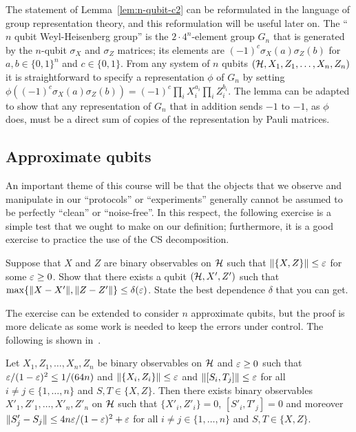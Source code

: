\begin{remark}
The statement of Lemma~\ref{lem:n-qubit-c2} can be reformulated in the language of group representation theory, and this reformulation will be useful later on. The ``$n$ qubit Weyl-Heisenberg group'' is the $2\cdot 4^n$-element group $G_n$ that is generated by the $n$-qubit $\sigma_X$ and $\sigma_Z$ matrices; its elements are $(-1)^c\sigma_X(a)\sigma_Z(b)$ for $a,b\in\{0,1\}^n$ and $c\in\{0,1\}$. From any system of $n$ qubits $(\mathcal{H},X_1,Z_1,\ldots,X_n,Z_n)$ it is straightforward to specify a representation $\phi$ of $G_n$ by setting $\phi((-1)^c\sigma_X(a)\sigma_Z(b)) = (-1)^c \prod_i X_i^{a_i} \prod_i Z_i^{b_i}$. The lemma can be adapted to show that any representation of $G_n$ that in addition sends $-1$ to $-1$, as $\phi$ does, must be a direct sum of copies of the representation by Pauli matrices. 
\end{remark}

\subsection{Approximate qubits}

An important theme of this course will be that the objects that we observe and manipulate in our ``protocols'' or ``experiments'' generally cannot be assumed to be perfectly ``clean'' or ``noise-free''. In this respect, the following exercise is a simple test that we ought to make on our definition; furthermore, it is a good exercise to practice the use of the CS decomposition. 

\begin{exercise}
Suppose that $X$ and $Z$ are binary observables on $\mathcal{H}$ such that $\|\{X,Z\}\|\leq \varepsilon$ for some $\varepsilon \geq 0$. Show that there exists a qubit $(\mathcal{H},X',Z')$ such that $\max\{\|X-X'\|,\|Z-Z'\|\} \leq \delta(\varepsilon)$. State the best dependence $\delta$ that you can get. 
\end{exercise} 

The exercise can be extended to consider $n$ approximate qubits, but the proof is more delicate as some work is needed to keep the errors under control. The following is shown in~\cite{chao2017overlapping}. 

\begin{theorem}
Let $X_1,Z_1,\ldots,X_n,Z_n$ be binary observables on $\mathcal{H}$ and $\varepsilon \geq 0$ such that $\varepsilon/(1-\varepsilon)^2 \leq 1/(64n)$ and $\|\{X_i,Z_i\}\|\leq \varepsilon$ and $\|[S_i,T_j]\|\leq \varepsilon$ for all $i\neq j \in \{1,\ldots, n\}$ and $S,T \in \{X,Z\}$. Then there exists  binary observables $X'_1,Z'_1,\ldots,X'_n,Z'_n$ on $\mathcal{H}$ such that $\{X'_i,Z'_i\}=0$, $[S'_i,T'_j]=0$ and moreover $\|S'_j-S_j\| \leq 4n\varepsilon/(1-\varepsilon)^2 + \varepsilon$ for all $i\neq j\in \{1,\ldots,n\}$ and $S,T\in\{X,Z\}$.
\end{theorem}


